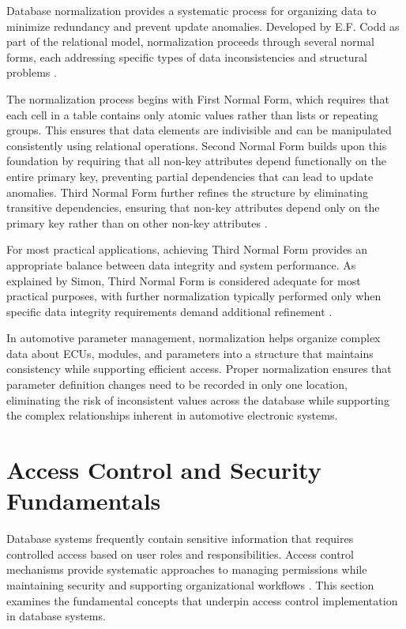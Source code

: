Database normalization provides a systematic process for organizing data to minimize redundancy and prevent update anomalies. Developed by E.F. Codd as part of the relational model, normalization proceeds through several normal forms, each addressing specific types of data inconsistencies and structural problems \cite{codd1970relational}.

The normalization process begins with First Normal Form, which requires that each cell in a table contains only atomic values rather than lists or repeating groups. This ensures that data elements are indivisible and can be manipulated consistently using relational operations. Second Normal Form builds upon this foundation by requiring that all non-key attributes depend functionally on the entire primary key, preventing partial dependencies that can lead to update anomalies. Third Normal Form further refines the structure by eliminating transitive dependencies, ensuring that non-key attributes depend only on the primary key rather than on other non-key attributes \cite{sciore2009database}.

For most practical applications, achieving Third Normal Form provides an appropriate balance between data integrity and system performance. As explained by Simon, Third Normal Form is considered adequate for most practical purposes, with further normalization typically performed only when specific data integrity requirements demand additional refinement \cite{simongetting}.

In automotive parameter management, normalization helps organize complex data about \acp{ECU}, modules, and parameters into a structure that maintains consistency while supporting efficient access. Proper normalization ensures that parameter definition changes need to be recorded in only one location, eliminating the risk of inconsistent values across the database while supporting the complex relationships inherent in automotive electronic systems.

\section{Access Control and Security Fundamentals}
\label{sec:access-control-security}

Database systems frequently contain sensitive information that requires controlled access based on user roles and responsibilities. Access control mechanisms provide systematic approaches to managing permissions while maintaining security and supporting organizational workflows \cite{sandhu1998role}. This section examines the fundamental concepts that underpin access control implementation in database systems.

